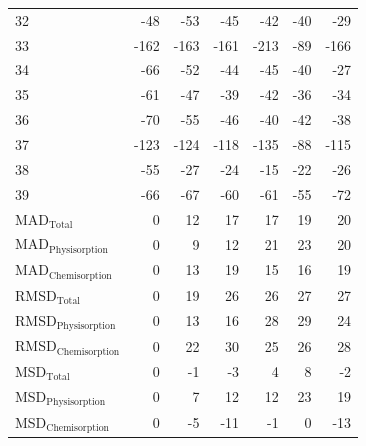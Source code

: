\begin{longtable}{lrrrrrr}
32 & -48 & -53 & -45 & -42 & -40 & -29 \\
33 & -162 & -163 & -161 & -213 & -89 & -166 \\
34 & -66 & -52 & -44 & -45 & -40 & -27 \\
35 & -61 & -47 & -39 & -42 & -36 & -34 \\
36 & -70 & -55 & -46 & -40 & -42 & -38 \\
37 & -123 & -124 & -118 & -135 & -88 & -115 \\
38 & -55 & -27 & -24 & -15 & -22 & -26 \\
39 & -66 & -67 & -60 & -61 & -55 & -72 \\
MAD$_{\text{Total}}$ & 0 & 12 & 17 & 17 & 19 & 20 \\
MAD$_{\text{Physisorption}}$ & 0 & 9 & 12 & 21 & 23 & 20 \\
MAD$_{\text{Chemisorption}}$ & 0 & 13 & 19 & 15 & 16 & 19 \\
RMSD$_{\text{Total}}$ & 0 & 19 & 26 & 26 & 27 & 27 \\
RMSD$_{\text{Physisorption}}$ & 0 & 13 & 16 & 28 & 29 & 24 \\
RMSD$_{\text{Chemisorption}}$ & 0 & 22 & 30 & 25 & 26 & 28 \\
MSD$_{\text{Total}}$ & 0 & -1 & -3 & 4 & 8 & -2 \\
MSD$_{\text{Physisorption}}$ & 0 & 7 & 12 & 12 & 23 & 19 \\
MSD$_{\text{Chemisorption}}$ & 0 & -5 & -11 & -1 & 0 & -13 \\
\bottomrule
\end{longtable}